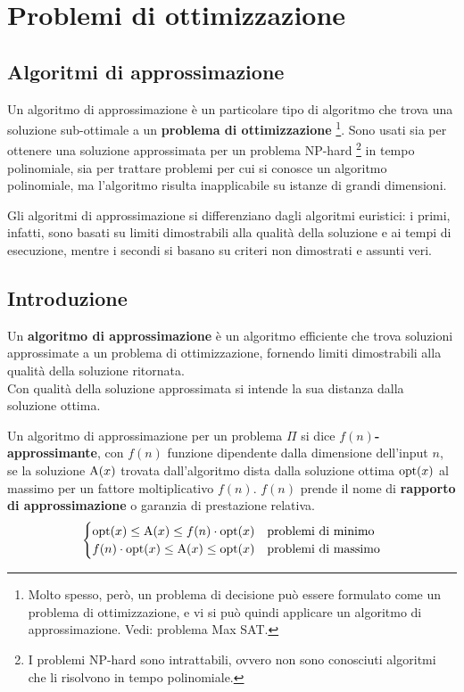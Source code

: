 \section{Problemi di ottimizzazione}
\subsection{Algoritmi di approssimazione}
Un algoritmo di approssimazione è un particolare tipo di algoritmo che trova
una soluzione sub-ottimale a un \textbf{problema di ottimizzazione}
\footnote{Molto spesso, però, un problema di decisione può essere formulato
come un problema di ottimizzazione, e vi si può quindi applicare un algoritmo
di approssimazione. Vedi: problema Max SAT.}.
Sono usati sia per ottenere una soluzione approssimata per un problema NP-hard
\footnote[][1cm]{I problemi NP-hard sono intrattabili, ovvero non sono
conosciuti algoritmi che li risolvono in tempo polinomiale.} in tempo
polinomiale, sia per trattare problemi per cui si conosce un algoritmo
polinomiale, ma l'algoritmo risulta inapplicabile su istanze di grandi
dimensioni.

Gli algoritmi di approssimazione si differenziano dagli algoritmi euristici:
i primi, infatti, sono basati su limiti dimostrabili alla qualità della
soluzione e ai tempi di esecuzione, mentre i secondi si basano su criteri
non dimostrati e assunti veri.

\subsection*{Introduzione}
\begin{defn}
    Un \textbf{algoritmo di approssimazione} è un algoritmo efficiente che
    trova soluzioni approssimate a un problema di ottimizzazione, fornendo
    limiti dimostrabili alla qualità della soluzione ritornata.\\
    Con qualità della soluzione approssimata si intende la sua distanza dalla
    soluzione ottima.
\end{defn}


\begin{defn}
    Un algoritmo di approssimazione per un problema $\Pi$ si dice
    \textbf{$f(n)$-approssimante}, con $f(n)$ funzione dipendente dalla
    dimensione dell'input $n$, se la soluzione $\textnormal{A}(x)$ trovata
    dall'algoritmo dista dalla soluzione ottima $\textnormal{opt}(x)$ al massimo per un
    fattore moltiplicativo $f(n)$.
    $f(n)$ prende il nome di \textbf{rapporto di approssimazione} o garanzia
    di prestazione relativa.
    \[
    \begin{cases}
        \textnormal{opt}(x) \le \textnormal{A}(x) \le f(n) \cdot \textnormal{opt}(x) & \textnormal{problemi di minimo}\\
        f(n) \cdot \textnormal{opt}(x) \le \textnormal{A}(x) \le \textnormal{opt}(x) & \textnormal{problemi di massimo}
    \end{cases}
    \]
\end{defn}

